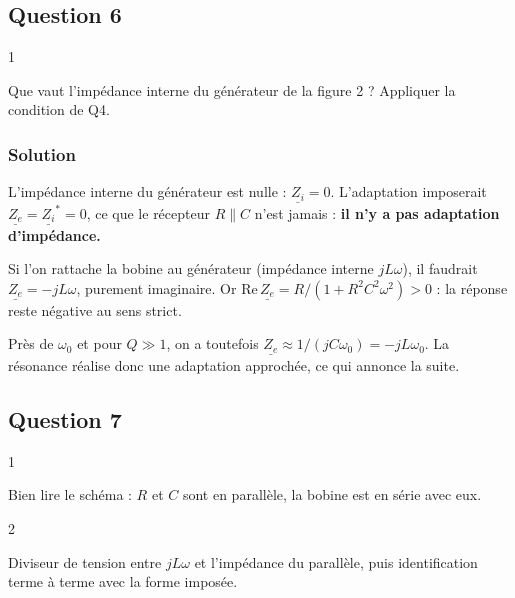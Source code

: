 \documentclass[11pt,a4paper]{article}
\begin{document}
\hypertarget{question-6}{%
\subsection{Question 6}\label{question-6}}

\begin{indication}{1}

Que vaut l'impédance interne du générateur de la figure 2 ? Appliquer la condition de Q4.

\end{indication}

\hypertarget{solution-5}{%
\subsubsection{Solution}\label{solution-5}}

L'impédance interne du générateur est nulle : \(\underline{Z_i}=0\). L'adaptation imposerait \(\underline{Z_e}=\underline{Z_i}^*=0\), ce que le récepteur \(R\parallel C\) n'est jamais : \textbf{il n'y a pas adaptation d'impédance.}

Si l'on rattache la bobine au générateur (impédance interne \(jL\omega\)), il faudrait \(\underline{Z_e}=-jL\omega\), purement imaginaire. Or \(\mathrm{Re}\,\underline{Z_e}=R/(1+R^2C^2\omega^2)>0\) : la réponse reste négative au sens strict.

Près de \(\omega_0\) et pour \(Q\gg1\), on a toutefois \(\underline{Z_e}\approx1/(jC\omega_0)=-jL\omega_0\). La résonance réalise donc une adaptation approchée, ce qui annonce la suite.

\hypertarget{question-7}{%
\subsection{Question 7}\label{question-7}}

\begin{indication}{1}

Bien lire le schéma : \(R\) et \(C\) sont en parallèle, la bobine est en série avec eux.

\end{indication}

\begin{indication}{2}

Diviseur de tension entre \(jL\omega\) et l'impédance du parallèle, puis identification terme à terme avec la forme imposée.

\end{indication}
\end{document}
